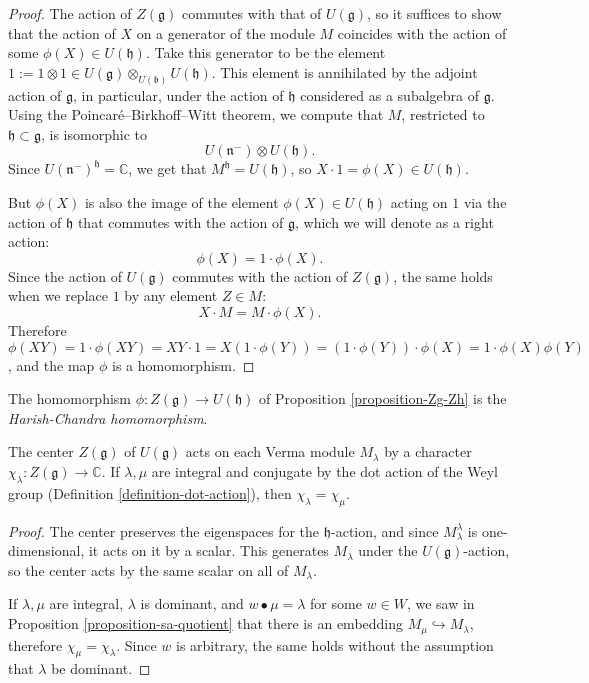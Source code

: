 \begin{proof}
 The action of $Z(\mathfrak g)$ commutes with that of $U(\mathfrak g)$, so it suffices to show that the action of $X$ on a generator of the module $M$ coincides with the action of some $\phi(X)\in U(\mathfrak h)$. Take this generator to be the element $1:=1\otimes 1 \in  U(\mathfrak g)\otimes_{U(\mathfrak b)} U(\mathfrak h)$. This element is annihilated by the adjoint action of $\mathfrak g$, in particular, under the action of $\mathfrak h$ considered as a subalgebra of $\mathfrak g$. Using the Poincar\'e--Birkhoff--Witt theorem, we compute that $M$, restricted to $\mathfrak h\subset \mathfrak g$, is isomorphic to 
 $$U(\mathfrak n^-) \otimes  U(\mathfrak h).$$
 Since $U(\mathfrak n^-)^{\mathfrak h} = \mathbb C$, we get that $M^{\mathfrak h} =U(\mathfrak h)$, so $X\cdot 1 = \phi(X)\in U(\mathfrak h)$. 
 
 But $\phi(X)$ is also the image of the element $\phi(X)\in U(\mathfrak h)$ acting on $1$ via the action of $\mathfrak h$ that commutes with the action of $\mathfrak g$, which we will denote as a right action:
 $$ \phi(X) = 1\cdot \phi(X).$$
 Since the action of $U(\mathfrak g)$ commutes with the action of $Z(\mathfrak g)$, the same holds when we replace $1$ by any element $Z\in M$:
 $$ X\cdot M = M\cdot \phi(X).$$
 Therefore $\phi(XY) = 1\cdot \phi(XY) = XY \cdot 1 = X(1\cdot \phi(Y)) = (1\cdot \phi(Y))\cdot \phi(X) = 1\cdot \phi(X)\phi(Y)$, and the map $\phi$ is a homomorphism.
\end{proof}

\begin{definition}
 \label{definition-HC-homomorphism}
The homomorphism $\phi: Z(\mathfrak g)\to U(\mathfrak h)$ of Proposition \ref{proposition-Zg-Zh} is the {\it Harish-Chandra homomorphism}.
\end{definition}

\begin{proposition}
\label{proposition-HCimage-Winvariant}
 The center $Z(\mathfrak g)$ of $U(\mathfrak g)$ acts on each Verma module $M_\lambda$ by a character $\chi_\lambda: Z(\mathfrak g)\to \mathbb C$. If $\lambda, \mu$ are integral and conjugate by the dot action of the Weyl group (Definition \ref{definition-dot-action}), then $\chi_\lambda = \chi_\mu$. 
\end{proposition}

\begin{proof}
 The center preserves the eigenspaces for the $\mathfrak h$-action, and since $M_\lambda^\lambda$ is one-dimensional, it acts on it by a scalar. This generates $M_\lambda$ under the $U(\mathfrak g)$-action, so the center acts by the same scalar on all of $M_\lambda$.
 
 If $\lambda, \mu$ are integral, $\lambda$ is dominant, and $w\bullet \mu = \lambda$  for some $w\in W$, we saw in Proposition \ref{proposition-sa-quotient} that there is an embedding $M_\mu \hookrightarrow M_\lambda$, therefore $\chi_\mu=\chi_\lambda$. Since $w$ is arbitrary, the same holds without the assumption that $\lambda$ be dominant. 
\end{proof}



